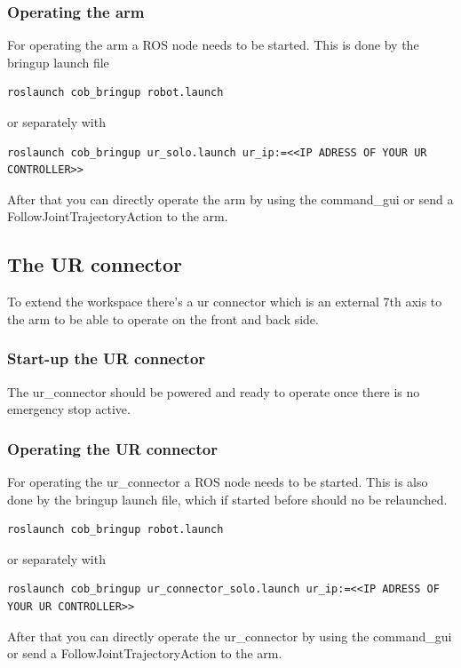 \subsubsection{Operating the arm}
For operating the arm a ROS node needs to be started. This is done by the bringup launch file
\begin{lstlisting}
roslaunch cob_bringup robot.launch
\end{lstlisting}
or separately with 
\begin{lstlisting}
roslaunch cob_bringup ur_solo.launch ur_ip:=<<IP ADRESS OF YOUR UR CONTROLLER>>
\end{lstlisting}
After that you can directly operate the arm by using the command\_gui or send a FollowJointTrajectoryAction to the arm.

\subsection{The UR connector}
To extend the workspace there's a ur connector which is an external 7th axis to the arm to be able to operate on the front and back side.

\subsubsection{Start-up the UR connector}
The ur\_connector should be powered and ready to operate once there is no emergency stop active.

\subsubsection{Operating the UR connector}
For operating the ur\_connector a ROS node needs to be started. This is also done by the bringup launch file, which if started before should no be relaunched.
\begin{lstlisting}
roslaunch cob_bringup robot.launch
\end{lstlisting}
or separately with 
\begin{lstlisting}
roslaunch cob_bringup ur_connector_solo.launch ur_ip:=<<IP ADRESS OF YOUR UR CONTROLLER>>
\end{lstlisting}
After that you can directly operate the ur\_connector by using the command\_gui or send a FollowJointTrajectoryAction to the arm.
